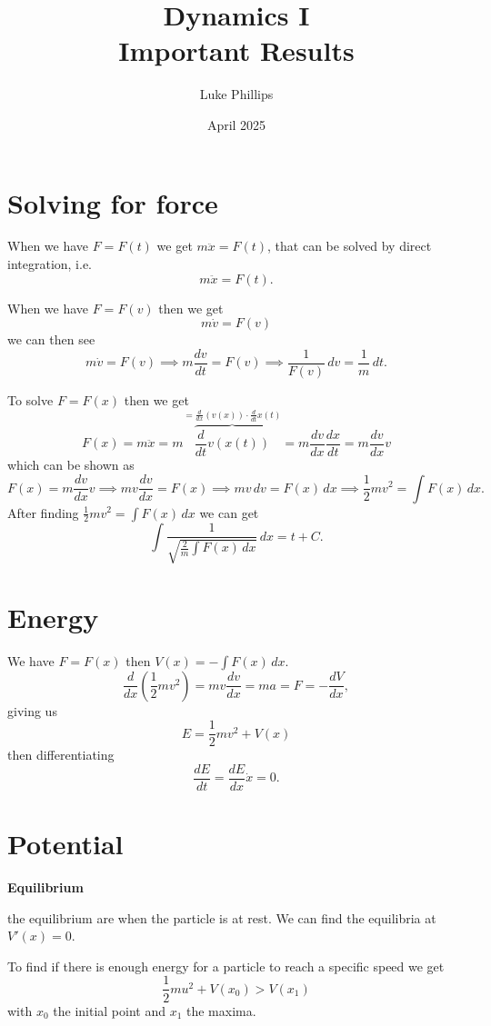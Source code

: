 \documentclass[10pt, a4paper]{article}
\title{Dynamics I \\
    \large Important Results}
\author{Luke Phillips}
\date{April 2025}
\begin{document}
\maketitle

\newpage

\tableofcontents

\newpage

\section{Solving for force}
When we have $F = F(t)$ we get $m\ddot{x} = F(t)$,
that can be solved by direct integration,
i.e.
\[
m\ddot{x} = F(t).
\]

When we have $F = F(v)$ then we get
\[
m\dot{v} = F(v)
\]
we can then see
\[
m\dot{v} = F(v) \implies m\frac{dv}{dt} = F(v) \implies \frac{1}{F(v)}\,dv = \frac{1}{m}\,dt.
\]

To solve $F = F(x)$ then we get
\[
F(x) =m\ddot{x} = m\overbrace{\frac{d}{dt}v(x(t))}^{= \frac{d}{dx}(v(x))\cdot\frac{d}{dt}x(t)} = m\frac{dv}{dx}\frac{dx}{dt} = m\frac{dv}{dx}v
\]
which can be shown as
\[
F(x) = m\frac{dv}{dx}v \implies mv\frac{dv}{dx} = F(x) \implies mv\,dv = F(x)\,dx \implies \frac{1}{2}mv ^ 2 = \int F(x)\,dx.
\]
After finding $\frac{1}{2}mv ^ 2 = \int F(x)\,dx$ we can get
\[
\int\frac{1}{\sqrt{\frac{2}{m}\int F(x)\,dx}}\,dx = t + C.
\]

\newpage

\section{Energy}
We have $F = F(x)$ then $V(x) = -\int F(x)\,dx$.
\[
\frac{d}{dx}\left(\frac{1}{2}mv ^ 2\right) = mv\frac{dv}{dx} = ma = F = -\frac{dV}{dx},
\]
giving us
\[
E = \frac{1}{2}mv ^ 2 + V(x)
\]
then differentiating
\[
\frac{dE}{dt} = \frac{dE}{dx}\dot{x} = 0.
\]

\newpage

\section{Potential}

\textbf{Equilibrium}

the equilibrium are when the particle is at rest.
We can find the equilibria at $V'(x) = 0$.

To find if there is enough energy for a particle to reach a specific speed we get
\[
\frac{1}{2}mu ^ 2 + V(x_0) > V(x_1)
\]
with $x_0$ the initial point and $x_1$ the maxima.
\end{document}
